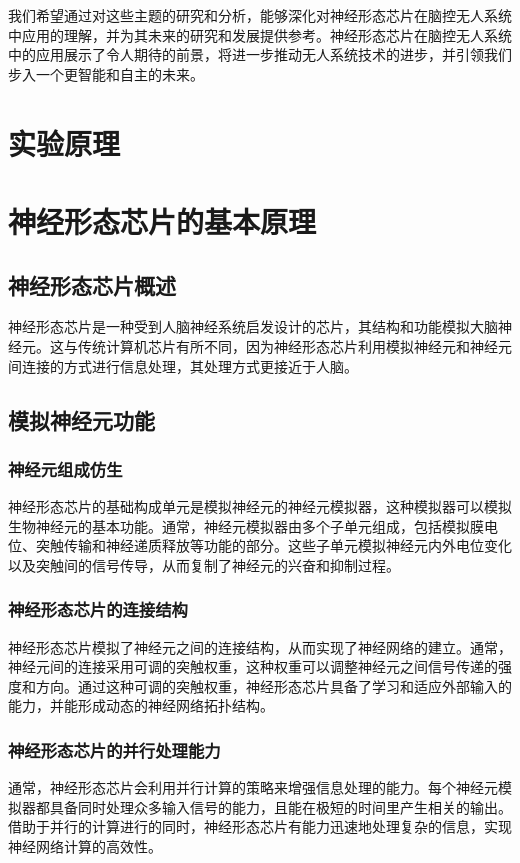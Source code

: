 \documentclass{thuemp}
\begin{document}
我们希望通过对这些主题的研究和分析，能够深化对神经形态芯片在脑控无人系统中应用的理解，并为其未来的研究和发展提供参考。神经形态芯片在脑控无人系统中的应用展示了令人期待的前景，将进一步推动无人系统技术的进步，并引领我们步入一个更智能和自主的未来。


\section{实验原理}

\section{神经形态芯片的基本原理}

\subsection{神经形态芯片概述}

神经形态芯片是一种受到人脑神经系统启发设计的芯片，其结构和功能模拟大脑神经元。这与传统计算机芯片有所不同，因为神经形态芯片利用模拟神经元和神经元间连接的方式进行信息处理，其处理方式更接近于人脑。

\subsection{模拟神经元功能}

\subsubsection{神经元组成仿生}
神经形态芯片的基础构成单元是模拟神经元的神经元模拟器，这种模拟器可以模拟生物神经元的基本功能。通常，神经元模拟器由多个子单元组成，包括模拟膜电位、突触传输和神经递质释放等功能的部分。这些子单元模拟神经元内外电位变化以及突触间的信号传导，从而复制了神经元的兴奋和抑制过程。

\subsubsection{神经形态芯片的连接结构}
神经形态芯片模拟了神经元之间的连接结构，从而实现了神经网络的建立。通常，神经元间的连接采用可调的突触权重，这种权重可以调整神经元之间信号传递的强度和方向。通过这种可调的突触权重，神经形态芯片具备了学习和适应外部输入的能力，并能形成动态的神经网络拓扑结构。

\subsubsection{神经形态芯片的并行处理能力}
通常，神经形态芯片会利用并行计算的策略来增强信息处理的能力。每个神经元模拟器都具备同时处理众多输入信号的能力，且能在极短的时间里产生相关的输出。借助于并行的计算进行的同时，神经形态芯片有能力迅速地处理复杂的信息，实现神经网络计算的高效性。
\end{document}
